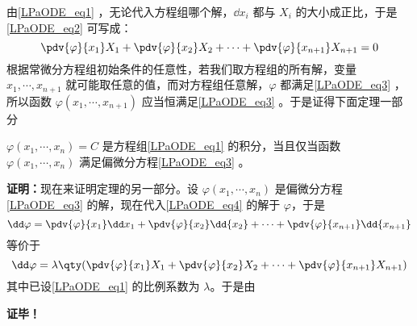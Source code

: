由\autoref{LPaODE_eq1} ，无论代入方程组哪个解，$\dd x_i$ 都与 $X_i$ 的大小成正比，于是\autoref{LPaODE_eq2} 可写成：
\begin{equation}\label{LPaODE_eq3}
\pdv{\varphi}{x_1}X_1+\pdv{\varphi}{x_2}X_2+\cdots+\pdv{\varphi}{x_{n+1}}X_{n+1}=0
\end{equation}
根据常微分方程组初始条件的任意性，若我们取方程组的所有解，变量 $x_1,\cdots,x_{n+1}$ 就可能取任意的值，而对方程组任意解，$\varphi$ 都满足\autoref{LPaODE_eq3} ，所以函数 $\varphi(x_1,\cdots,x_{n+1})$ 应当恒满足\autoref{LPaODE_eq3} 。于是证得下面定理一部分
\begin{theorem}{}
 $\varphi(x_1,\cdots,x_n)=C$ 是方程组\autoref{LPaODE_eq1} 的积分，当且仅当函数 $\varphi(x_1,\cdots,x_n)$ 满足偏微分方程\autoref{LPaODE_eq3} 。
\end{theorem}
 \textbf{证明：}现在来证明定理的另一部分。设 $\varphi(x_1,\cdots,x_n)$ 是偏微分方程\autoref{LPaODE_eq3} 的解，现在代入\autoref{LPaODE_eq4} 的解于 $\varphi$，于是
 \begin{equation}
 \dd\varphi=\pdv{\varphi}{x_1}\dd x_1+\pdv{\varphi}{x_2}\dd{x_2}+\cdots+\pdv{\varphi}{x_{n+1}}\dd{x_{n+1}}
 \end{equation}
 等价于
 \begin{equation}
 \dd\varphi=\lambda\qty(\pdv{\varphi}{x_1}X_1+\pdv{\varphi}{x_2}X_2+\cdots+\pdv{\varphi}{x_{n+1}}X_{n+1})
 \end{equation}
 其中已设\autoref{LPaODE_eq1} 的比例系数为 $\lambda$。于是由

 \textbf{证毕！}
